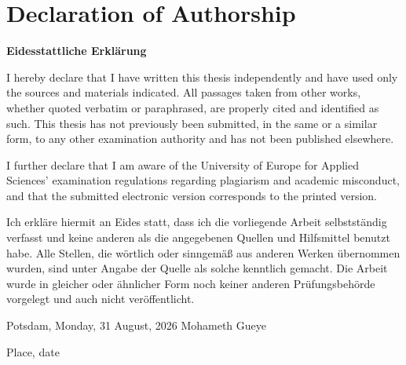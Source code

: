 \chapter*{Declaration of Authorship}

\textbf{Eidesstattliche Erklärung}

\vspace{1em}

I hereby declare that I have written this thesis independently and have used only the sources and materials indicated. All passages taken from other works, whether quoted verbatim or paraphrased, are properly cited and identified as such. This thesis has not previously been submitted, in the same or a similar form, to any other examination authority and has not been published elsewhere.

I further declare that I am aware of the University of Europe for Applied Sciences' examination regulations regarding plagiarism and academic misconduct, and that the submitted electronic version corresponds to the printed version.

\vspace{1em}

Ich erkläre hiermit an Eides statt, dass ich die vorliegende Arbeit selbstständig verfasst und keine anderen als die angegebenen Quellen und Hilfsmittel benutzt habe. Alle Stellen, die wörtlich oder sinngemäß aus anderen Werken übernommen wurden, sind unter Angabe der Quelle als solche kenntlich gemacht. Die Arbeit wurde in gleicher oder ähnlicher Form noch keiner anderen Prüfungsbehörde vorgelegt und auch nicht veröffentlicht.

\vspace{2.5cm}

\noindent
Potsdam, Monday, 31 August, 2026
\hfill
Mohameth Gueye

\vspace{0.4cm}

\noindent
Place, date